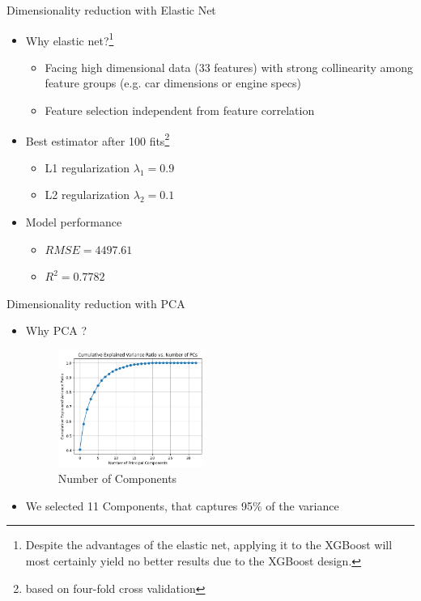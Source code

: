 \documentclass{beamer}
\begin{document}
    \begin{frame}{Dimensionality reduction with Elastic Net} 
    \begin{itemize}
        \item Why elastic net?\footnote{Despite the advantages of the elastic net, applying it to the XGBoost will most certainly yield no better results due to the XGBoost design.}
            \begin{itemize}
                \item Facing high dimensional data (33 features) with strong collinearity among feature groups (e.g. car dimensions or engine specs)
                \item Feature selection independent from feature correlation   
            \end{itemize}
        \item Best estimator after 100 fits\footnote{based on four-fold cross validation}
            \begin{itemize}
                \item L1 regularization $\lambda_{1}= 0.9$
                \item L2 regularization $\lambda_{2}= 0.1$
            \end{itemize}
        \item Model performance
            \begin{itemize}
                \item $RMSE = 4497.61$
                \item $R^{2} = 0.7782$
            \end{itemize}
    \end{itemize}
    
       
    \end{frame}

    \begin{frame}{Dimensionality reduction with PCA} 
        
    \begin{itemize}
        \item Why PCA ?
    \begin{figure}[ht]
        \centering
        \includegraphics[width=0.45\textwidth]{PCA.png}
        \caption{Number of Components}
        \label{PCA}
    \end{figure}
    \item We selected 11 Components, that captures 95\% of the variance
    \end{itemize}
    \end{frame}
\end{document}
